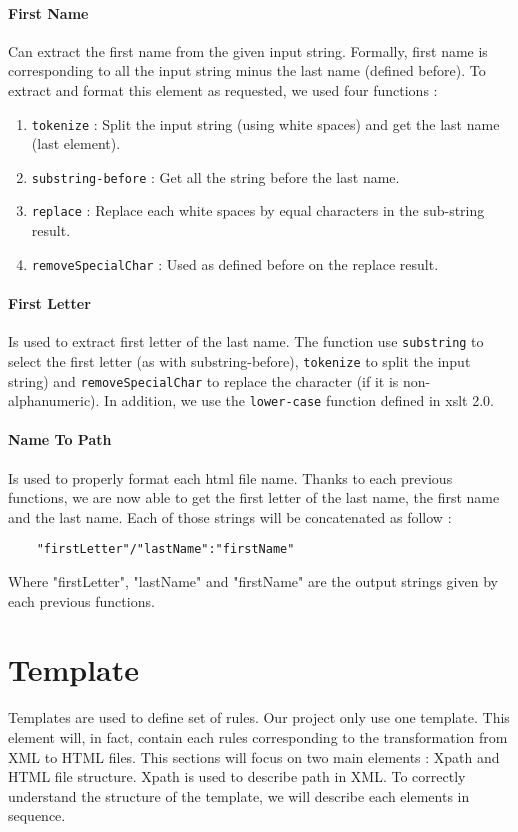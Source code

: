 \documentclass{article}
\begin{document}
\paragraph{First Name} Can extract the first name from the given input string. Formally, first name is corresponding to all the input string minus the last name (defined before). To extract and format this element as requested, we used four functions :
\begin{enumerate}
\item \verb|tokenize| : Split the input string (using white spaces) and get the last name (last element).
\item \verb|substring-before| : Get all the string before the last name.
\item \verb|replace| : Replace each white spaces by equal characters in the sub-string result.
\item \verb|removeSpecialChar| : Used as defined before on the replace result.
\end{enumerate}

\paragraph{First Letter} Is used to extract first letter of the last name. The function use \verb|substring| to select the first letter (as with substring-before), \verb|tokenize| to split the input string) and \verb|removeSpecialChar| to replace the character (if it is non-alphanumeric). In addition, we use the \verb|lower-case| function defined in xslt 2.0. 

\paragraph{Name To Path} Is used to properly format each html file name. Thanks to each previous functions, we are now able to get the first letter of the last name, the first name and the last name. Each of those strings will be concatenated as follow : 
\begin{verbatim}
    "firstLetter"/"lastName":"firstName"
\end{verbatim}
Where "firstLetter", "lastName" and "firstName" are the output strings given by each previous functions.

\section{Template}
Templates are used to define set of rules. Our project only use one template. This element will, in fact, contain each rules corresponding to the transformation from XML to HTML files. This sections will focus on two main elements : Xpath and HTML file structure. Xpath is used to describe path in XML. To correctly understand the structure of the template, we will describe each elements in sequence.
\end{document}
